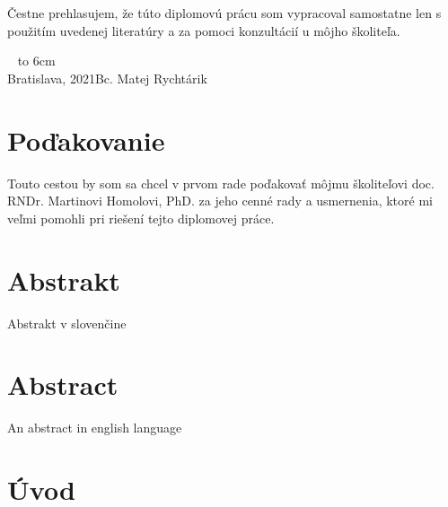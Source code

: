 \documentclass[12pt, a4paper, oneside]{book}
\newcommand\mfauthor{Bc. Matej Rychtárik}
\newcommand\mfplacedate{Bratislava, 2021}
\begin{document}


\thispagestyle{empty}

%

{~}\vspace{12cm}

\noindent
\begin{minipage}{0.25\textwidth}~\end{minipage}
\begin{minipage}{0.75\textwidth}
Čestne prehlasujem, že túto diplomovú prácu som vypracoval samostatne len s použitím uvedenej literatúry a za pomoci konzultácií u môjho školiteľa.
\newline \newline
\end{minipage}
\vfill
~ \hfill {\hbox to 6cm{\dotfill}} \\
\mfplacedate \hfill \mfauthor
\vfill\eject 

\chapter*{Poďakovanie}\label{chap:thank_you}
Touto cestou by som sa chcel v prvom rade poďakovať môjmu školiteľovi doc. RNDr. Martinovi Homolovi, PhD. za jeho cenné rady a usmernenia, ktoré mi veľmi pomohli pri riešení tejto diplomovej práce. 
\vfill\eject 

\chapter*{Abstrakt}\label{chap:abstract_sk}
Abstrakt v slovenčine

\chapter*{Abstract}\label{chap:abstract_en}
An abstract in english language

\tableofcontents

\mainmatter

\chapter{Úvod}\label{chap:intro}
\end{document}
